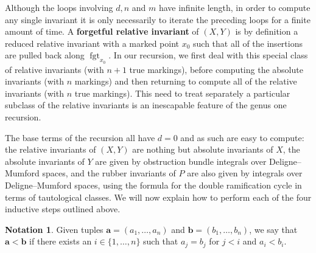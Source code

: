 \documentclass[11pt]{amsart}
\newcommand{\fgt}{\operatorname{fgt}}
\theoremstyle{definition}
\newtheorem{notation}[thm]{Notation}
\theoremstyle{definition}
\begin{document}
\begin{algorithm}
\DontPrintSemicolon
{}
\end{algorithm}
\noindent Although the loops involving $d, n$ and $m$ have infinite length, in order to compute any single invariant it is only necessarily to iterate the preceding loops for a finite amount of time. A \textbf{forgetful relative invariant} of $(X,Y)$ is by definition a reduced relative invariant with a marked point $x_0$ such that all of the insertions are pulled back along $\fgt_{x_0}$. In our recursion, we first deal with this special class of relative invariants (with $n+1$ true markings), before computing the absolute invariants (with $n$ markings) and then returning to compute all of the relative invariants (with $n$ true markings). This need to treat separately a particular subclass of the relative invariants is an inescapable feature of the genus one recursion.

The base terms of the recursion all have $d=0$ and as such are easy to compute: the relative invariants of $(X,Y)$ are nothing but absolute invariants of $X$, the absolute invariants of $Y$ are given by obstruction bundle integrals over Deligne--Mumford spaces, and the  rubber invariants of $P$ are also given by integrals over Deligne--Mumford spaces, using the formula for the double ramification cycle \cite{Hain,JPPZ} in terms of tautological classes. We will now explain how to perform each of the four inductive steps outlined above.

\begin{notation}Given tuples $\mathbf{a}=(a_1,\ldots,a_n)$ and $\mathbf{b}=(b_1,\ldots,b_n)$, we say that $\mathbf{a}<\mathbf{b}$ if there exists an $i \in \{1,\ldots,n\}$ such that $a_j = b_j$ for $j < i$ and $a_i < b_i$.\end{notation}
\end{document}
